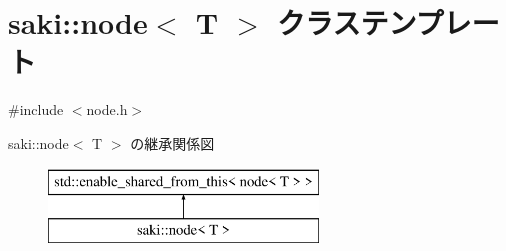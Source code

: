 \hypertarget{classsaki_1_1node}{}\section{saki\+:\+:node$<$ T $>$ クラステンプレート}
\label{classsaki_1_1node}


{\ttfamily \#include $<$node.\+h$>$}

saki\+:\+:node$<$ T $>$ の継承関係図\begin{figure}[H]
\begin{center}
\leavevmode
\includegraphics[height=2.000000cm]{classsaki_1_1node}
\end{center}
\end{figure}
